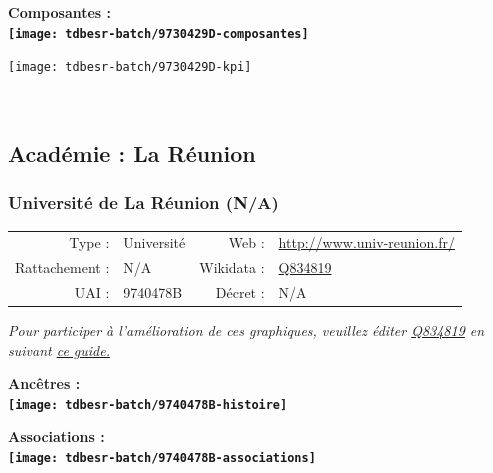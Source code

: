 \documentclass[12pt,french,]{article}
\begin{document}
\hrulefill

\begin{center} \bf Composantes : \\  
\texttt{[image: tdbesr-batch/9730429D-composantes]} \end{center}

\begin{center}\texttt{[image: tdbesr-batch/9730429D-kpi]} \end{center}\checkoddpage

\ifoddpage ~\newpage \fi   

\hypertarget{acaduxe9mie-la-ruxe9union}{%
\subsection{Académie : La Réunion}\label{acaduxe9mie-la-ruxe9union}}

\hypertarget{universituxe9-de-la-ruxe9union-na}{%
\subsubsection{Université de La Réunion
(N/A)}\label{universituxe9-de-la-ruxe9union-na}}

\begin{tabular*}{\textwidth}{rp{5cm}rl}  
\hline  
Type : & Université & Web : &\href{http://www.univ-reunion.fr/}{http://www.univ-reunion.fr/} \\  
Rattachement : & N/A & Wikidata : & \href{https://www.wikidata.org/entity/Q834819}{Q834819} \\  
UAI : & 9740478B & Décret : & N/A \\  
\hline  
\end{tabular*}

\textit{\scriptsize Pour participer à l'amélioration de ces graphiques, veuillez éditer  \href{https://www.wikidata.org/entity/Q834819}{Q834819}  en suivant \href{https://github.com/cpesr/wikidataESR/blob/master/Rmd/wikidataESR.md}{ce guide.}}

\vspace{1cm}  
\begin{minipage}[b]{0.50\textwidth}\begin{center} \bf Ancêtres : \\  
\texttt{[image: tdbesr-batch/9740478B-histoire]} \end{center}\end{minipage}\begin{minipage}[b]{0.50\textwidth}\begin{center} \bf Associations : \\  
\texttt{[image: tdbesr-batch/9740478B-associations]} \end{center}\end{minipage}
\end{document}
